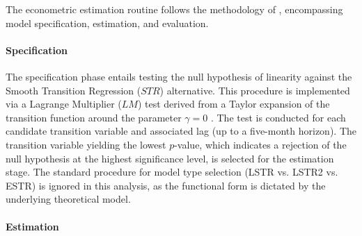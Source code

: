\documentclass[a4paper,10pt,final]{article}    %
\begin{document}
The econometric estimation routine follows the methodology of \citet{GrangerTerasvirta2010}, encompassing model specification, estimation, and evaluation.\paragraph{Specification}The specification phase entails testing the null hypothesis of linearity against the Smooth Transition Regression ($STR$) alternative. This procedure is implemented via a Lagrange Multiplier ($LM$) test derived from a Taylor expansion of the transition function around the parameter $\gamma = 0$ \citep{Terasvirta1994, vanDijk2002}. The test is conducted for each candidate transition variable and associated lag (up to a five-month horizon). The transition variable yielding the lowest $p$-value, which indicates a rejection of the null hypothesis at the highest significance level, is selected for the estimation stage. The standard procedure for model type selection (LSTR vs. LSTR2 vs. ESTR) is ignored in this analysis, as the functional form is dictated by the underlying theoretical model.

\paragraph{Estimation}
\end{document}
